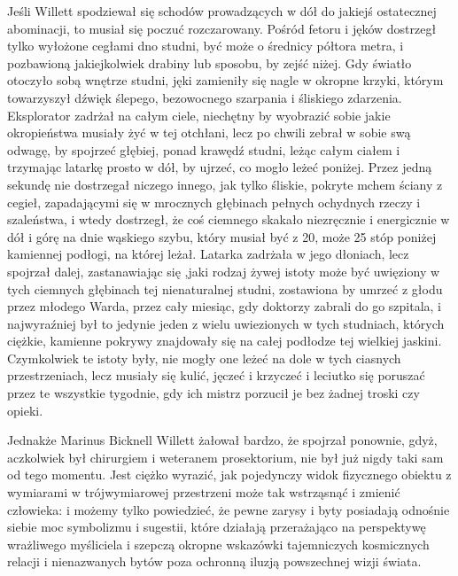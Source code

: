 Jeśli Willett spodziewał się schodów prowadzących w dół do jakiejś ostatecznej abominacji, to musiał się poczuć rozczarowany. Pośród fetoru i jęków dostrzegł tylko wyłożone cegłami dno studni, być może o średnicy półtora metra, i pozbawioną jakiejkolwiek drabiny lub sposobu, by zejść niżej. Gdy światło otoczyło sobą wnętrze studni, jęki zamieniły się nagle w okropne krzyki, którym towarzyszył dźwięk ślepego, bezowocnego szarpania i śliskiego zdarzenia. Eksplorator zadrżał na całym ciele, niechętny by wyobrazić sobie jakie okropieństwa musiały żyć w tej otchłani, lecz po chwili zebrał w sobie swą odwagę, by spojrzeć głębiej, ponad krawędź studni, leżąc całym ciałem i trzymając latarkę prosto w dół, by ujrzeć, co mogło leżeć poniżej. Przez jedną sekundę nie dostrzegał niczego innego, jak tylko śliskie, pokryte mchem ściany z cegieł, zapadającymi się w mrocznych głębinach pełnych ochydnych rzeczy i szaleństwa, i wtedy dostrzegł, że coś ciemnego skakało niezręcznie i energicznie w dół i górę na dnie wąskiego szybu, który musiał być z 20, może 25 stóp poniżej kamiennej podłogi, na której leżał. Latarka zadrżała w jego dłoniach, lecz spojrzał dalej, zastanawiając się ,jaki rodzaj żywej istoty może być uwięziony w tych ciemnych głębinach tej nienaturalnej studni, zostawiona by umrzeć z głodu przez młodego Warda, przez cały miesiąc, gdy doktorzy zabrali do go szpitala, i najwyraźniej był to jedynie jeden z wielu uwiezionych w tych studniach, których ciężkie, kamienne pokrywy znajdowały się na całej podłodze tej wielkiej jaskini. Czymkolwiek te istoty były, nie mogły one leżeć na dole w tych ciasnych przestrzeniach, lecz musiały się kulić, jęczeć i krzyczeć i leciutko się poruszać przez te wszystkie tygodnie, gdy ich mistrz porzucił je bez żadnej troski czy opieki. 

Jednakże Marinus Bicknell Willett żałował bardzo, że spojrzał ponownie, gdyż, aczkolwiek był chirurgiem i weteranem prosektorium, nie był już nigdy taki sam od tego momentu. Jest ciężko wyrazić, jak pojedynczy widok fizycznego obiektu z wymiarami w trójwymiarowej przestrzeni może tak wstrząsnąć i zmienić człowieka: i możemy tylko powiedzieć, że pewne zarysy i byty posiadają odnośnie siebie moc symbolizmu i sugestii, które działają przerażająco na perspektywę wrażliwego myśliciela i szepczą okropne wskazówki tajemniczych kosmicznych relacji i nienazwanych bytów poza ochronną iluzją powszechnej wizji świata. 

